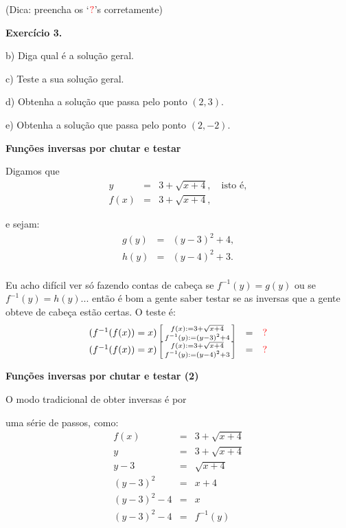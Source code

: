 \documentclass[oneside,12pt]{article}
\begin{document}
(Dica: preencha os `$\Rd{?}$'s corretamente)

\newpage

{\bf Exercício 3.}

b) Diga qual é a solução geral.

c) Teste a sua solução geral.

d) Obtenha a solução que passa pelo ponto $(2,3)$.

e) Obtenha a solução que passa pelo ponto $(2,-2)$.



\newpage


{\bf Funções inversas por chutar e testar}

Digamos que 
%
$$\begin{array}{rcl}
  y &=& 3 + \sqrt{x+4}, \quad \text{isto é}, \\
  f(x) &=& 3 + \sqrt{x+4},
  \end{array}
$$

e sejam:
%
$$\begin{array}{rcl}
  g(y) &=& (y-3)^2 + 4, \\
  h(y) &=& (y-4)^2 + 3. \\
  \end{array}
$$

Eu acho difícil ver só fazendo contas de cabeça se $f^{-1}(y) = g(y)$
ou se $f^{-1}(y) = h(y)$... então é bom a gente saber testar se as
inversas que a gente obteve de cabeça estão certas. O teste é:
%
$$\begin{array}{rcl}
  (f^{-1}(f(x)) = x) \bsm{ f(x) := 3 + \sqrt{x+4} \\ f^{-1}(y) := (y-3)^2 + 4 } &=& \ColorRed{?} \\
  (f^{-1}(f(x)) = x) \bsm{ f(x) := 3 + \sqrt{x+4} \\ f^{-1}(y) := (y-4)^2 + 3 } &=& \ColorRed{?} \\
  \end{array}
$$


\newpage


{\bf Funções inversas por chutar e testar (2)}

O modo tradicional de obter inversas é por

uma série de passos, como:
%
$$\begin{array}{rcl}
  f(x) &=& 3 + \sqrt{x+4} \\
  y &=& 3 + \sqrt{x+4} \\
  y - 3 &=& \sqrt{x+4} \\
  (y - 3)^2 &=& x+4 \\
  (y - 3)^2 - 4 &=& x \\
  (y - 3)^2 - 4 &=& f^{-1}(y) \\
  \end{array}
$$
\end{document}
